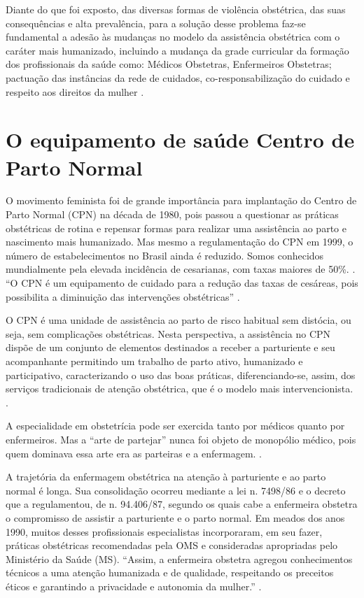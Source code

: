 Diante do que foi exposto, das diversas formas de violência obstétrica, das suas consequências e alta prevalência, para a solução desse problema faz-se fundamental a adesão às mudanças no modelo da assistência obstétrica com o caráter mais humanizado, incluindo a mudança da grade curricular da formação dos profissionais da saúde como: Médicos Obstetras, Enfermeiros Obstetras;  pactuação das instâncias da rede de cuidados, co-responsabilização do cuidado e respeito aos direitos da mulher \cite{rodrigues2018violencia,gonccalves2014violencia}.

\section{O equipamento de saúde Centro de Parto Normal}

O movimento feminista foi de grande importância para implantação do Centro de Parto Normal (\acrshort{CPN}) na década de 1980, pois passou a questionar as práticas obstétricas de rotina e repensar formas para realizar uma assistência ao parto e nascimento mais humanizado. Mas mesmo a regulamentação do CPN em 1999, o número de estabelecimentos no Brasil ainda é reduzido. Somos conhecidos mundialmente pela elevada incidência de cesarianas, com taxas maiores de 50\%. \cite{garcia2017centro}. ``O CPN é um equipamento de cuidado para a redução das taxas de cesáreas, pois possibilita a diminuição das intervenções obstétricas'' \cite{osava2011caracterizaccao}. 

O CPN é uma unidade de assistência ao parto de risco habitual sem distócia, ou seja, sem complicações obstétricas. Nesta perspectiva, a assistência no CPN dispõe de um conjunto de elementos destinados a receber a parturiente e seu acompanhante permitindo um trabalho de parto ativo, humanizado e participativo, caracterizando o uso das boas práticas, diferenciando-se, assim, dos serviços tradicionais de atenção obstétrica, que é o modelo mais intervencionista. \cite{garcia2017centro}.

A especialidade em obstetrícia pode ser exercida tanto por médicos quanto por enfermeiros. Mas a ``arte de partejar'' nunca foi objeto de monopólio médico, pois quem dominava essa arte era as parteiras e a enfermagem. \cite[p. 69]{maia2010humanizaccao}.

A trajetória da enfermagem obstétrica na atenção à parturiente e ao parto normal é longa. Sua consolidação ocorreu mediante a lei n. 7498/86 e o decreto que a regulamentou, de n. 94.406/87, segundo os quais cabe a enfermeira obstetra o compromisso de assistir a parturiente e o parto normal. Em meados dos anos 1990, muitos desses profissionais especialistas incorporaram, em seu fazer, práticas obstétricas recomendadas pela OMS e consideradas apropriadas pelo Ministério da Saúde (\acrshort{MS}). ``Assim, a enfermeira obstetra agregou conhecimentos técnicos a uma atenção humanizada e de qualidade, respeitando os preceitos éticos e garantindo a privacidade e autonomia da mulher.'' \cite{vargens2017contribuiccao}. 

